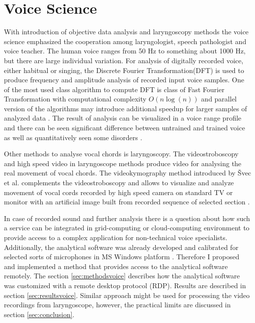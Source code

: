 \chapter{Voice Science}
\label{sec:voice}
With introduction of objective data analysis and laryngoscopy methods the voice science emphasized the cooperation among  laryngologist, speech pathologist and voice teacher.
The human voice ranges from 50 Hz to something about 1000 Hz, but there are large  individual variation. For analysis of digitally recorded voice, either habitual or singing, the Discrete Fourier Transformation(DFT) is used to produce frequency and amplitude analysis of recorded input voice samples. One of the most used class algorithm to compute DFT is class of Fast Fourier Transformation with computational complexity $O(n \log(n))$ \cite{Cooley1965,Frigo2005} and parallel version of the algorithms may introduce additional speedup for larger samples of analyzed data \cite{Gupta1993,Takahashi2003}. The result of analysis can be visualized in a voice range profile and there can be seen significant difference between untrained and trained voice as well as quantitatively seen some disorders  \cite{DeLeoLeBorgne2002,wuyts2003effects}.

Other methods to analyse vocal chords is laryngoscopy. The videostroboscopy and high speed video in laryngoscope methods produce video for analysing the real movement of vocal chords. The videokymography method introduced by Švec et al. complements the videostroboscopy and allows to visualize and analyze movement of vocal cords recorded by high speed camera on standard TV or monitor with an artificial image built from recorded sequence of selected section \cite{Svec1996,Svec2007}. 

In case of recorded sound and further analysis there is a question about how such a service can be integrated in grid-computing or cloud-computing environment to provide access to a complex application for non-technical voice specialists. Additionally, the analytical software was already developed and calibrated for selected sorts of microphones in MS Windows platform \cite{Fric2007,Fric2012}. Therefore I proposed and implemented a method that provides access to the analytical software remotely. The section \ref{sec:methodsvoice} describes how the analytical software was customized with a remote desktop protocol (RDP). Results are described in section \ref{sec:resultsvoice}. Similar approach might be used for processing the video recordings from laryngoscope, however, the practical limits are discussed in section \ref{sec:conclusion}. 


